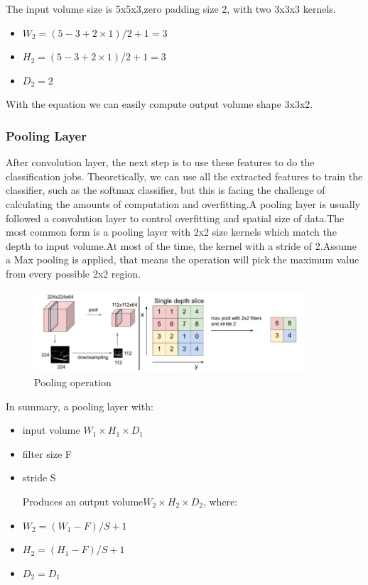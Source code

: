 \documentclass[12pt,a4paper]{report}
\begin{document}
The input volume size is 5x5x3,zero padding size 2, with two 3x3x3 kernels.
\begin{itemize}
\item $W_2=(5-3+2 \times 1)/2+1=3$
\item $H_2=(5-3+2 \times 1)/2+1=3$
\item $D_2=2$
\end{itemize}
With the equation we can easily compute output volume shape 3x3x2.

\newpage
\subsubsection{Pooling Layer \cite{cnn} }
After convolution layer, the next step is to use these features to do the classification jobs. Theoretically, we can use all the extracted features to train the classifier, such as the softmax classifier, but this is facing the challenge of calculating the amounts of computation and overfitting.A pooling layer is usually followed a convolution layer to control overfitting and spatial size of data.The most common form is a pooling layer with 2x2 size kernels which match the depth to input volume.At most of the time, the kernel with a stride of 2.Assume a Max pooling is applied, that means the operation will pick the maximum value from every possible  2x2 region.
\begin{figure}[h]
\centering
\includegraphics[width=0.9\textwidth]{pooling.png}
\caption{Pooling operation\cite{cnn}}
\end{figure}
In summary, a pooling layer with:
\begin{itemize} 
\item input volume $W_1 \times H_1 \times D_1$
\item filter size F
\item stride S

Produces an output volume$W_2 \times H_2 \times D_2$, where:
\item $W_2=(W_1-F)/S+1$
\item $H_2=(H_1-F)/S+1$
\item $D_2=D_1$
\end{itemize}
\end{document}
